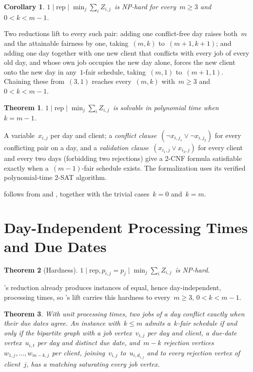 \documentclass[11pt,a4paper]{article}
\newtheorem{theorem}{Theorem}
\newtheorem{corollary}{Corollary}
\theoremstyle{definition}
\newcommand{\threefield}[3]{$#1\mid#2\mid#3$}
\newcommand{\rep}{\mathrm{rep}}
\newcommand{\EQUIJIT}{\threefield{1}{\rep}{\min_j \sum_i Z_{i,j}}}
\newcommand{\DDEQUIJIT}{\threefield{1}{\rep, p_{i,j}=p_j}{\min_j \sum_i Z_{i,j}}}
\begin{document}
\setcounter{corollary}{7}
\begin{corollary}
\label{cor:8}
\EQUIJIT\ is NP-hard for every~$m\ge3$ and~$0<k<m-1$.
\end{corollary}
Two reductions lift  to every such pair: adding one conflict-free day raises
both~$m$ and the attainable fairness by one, taking~$(m,k)$ to~$(m+1,k+1)$; and adding one
day together with one new client that conflicts with every job of every old day, and whose
own job occupies the new day alone, forces the new client onto the new day in any~$1$-fair
schedule, taking~$(m,1)$ to~$(m+1,1)$. Chaining these from~$(3,1)$ reaches every~$(m,k)$ with~$m\ge3$ and~$0<k<m-1$.

\setcounter{theorem}{8}
\begin{theorem}
\label{thm:9}
\EQUIJIT\ is solvable in polynomial time when~$k=m-1$.
\end{theorem}
A variable~$x_{i,j}$ per day and client; a \emph{conflict clause}~$(\lnot x_{i,j_1}\lor\lnot x_{i,j_2})$ for every conflicting pair on a day, and a
\emph{validation clause}~$(x_{i_1,j}\lor x_{i_2,j})$ for every client and every two days
(forbidding two rejections) give a 2-CNF formula satisfiable exactly when a~$(m-1)$-fair
schedule exists. The formalization uses its verified polynomial-time 2-SAT algorithm.

 follows from  and , together with the trivial cases~$k=0$ and~$k=m$.

\section{Day-Independent Processing Times and Due Dates}
\label{sec:dayindep}

\setcounter{theorem}{1}
\begin{theorem}[Hardness]
\label{thm:2hard}
\DDEQUIJIT\ is NP-hard.
\end{theorem}
's reduction already produces instances of equal, hence day-independent,
processing times, so 's lift carries this hardness to every~$m\ge3,\,0<k<m-1$.

\setcounter{theorem}{9}
\begin{theorem}
\label{thm:10}
With unit processing times, two jobs of a day conflict exactly when their due dates agree.
An instance with~$k\le m$ admits a~$k$-fair schedule if and only if the bipartite graph
with a \emph{job} vertex~$v_{i,j}$ per day and client, a \emph{due-date} vertex~$u_{i,t}$
per day and distinct due date, and~$m-k$ \emph{rejection} vertices~$w_{1,j},\dots,w_{m-k,j}$
per client, joining~$v_{i,j}$ to~$u_{i,d_{i,j}}$ and to every rejection vertex of
client~$j$, has a matching saturating every job vertex.
\end{theorem}
\end{document}
